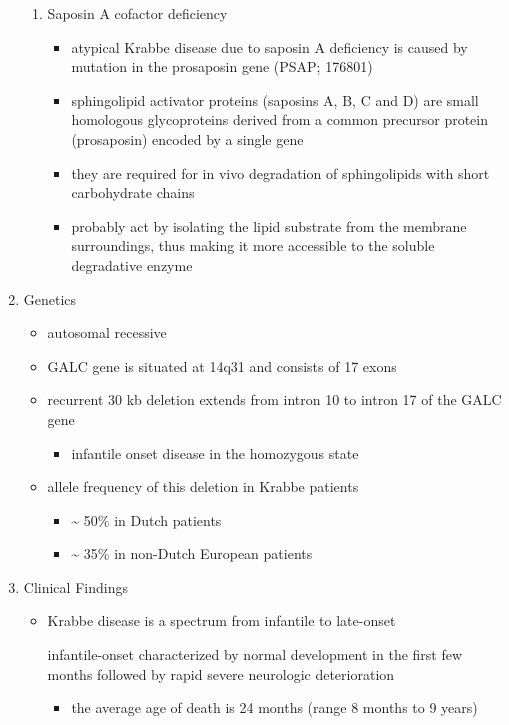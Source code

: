 \documentclass{scrartcl}
\begin{document}
\begin{enumerate}
\begin{enumerate}
\item Saposin A cofactor deficiency
\label{sec:orgf003849}

\begin{itemize}
\item atypical Krabbe disease due to saposin A deficiency is caused by mutation in the prosaposin gene (PSAP; 176801)
\item sphingolipid activator proteins (saposins A, B, C and D) are small
homologous glycoproteins derived from a common precursor protein
(prosaposin) encoded by a single gene
\item they are required for in vivo degradation of sphingolipids with short carbohydrate chains
\item probably act by isolating the lipid substrate from the membrane
surroundings, thus making it more accessible to the soluble
degradative enzyme
\end{itemize}
\end{enumerate}

\item Genetics
\label{sec:org3091962}
\begin{itemize}
\item autosomal recessive
\item GALC gene is situated at 14q31 and consists of 17 exons
\item recurrent 30 kb deletion extends from intron 10 to intron 17 of the GALC gene
\begin{itemize}
\item infantile onset disease in the homozygous state
\end{itemize}
\item allele frequency of this deletion in Krabbe patients
\begin{itemize}
\item \textasciitilde{} 50\% in Dutch patients
\item \textasciitilde{} 35\% in non-Dutch European patients
\end{itemize}
\end{itemize}

\item Clinical Findings
\label{sec:org1e8b5b5}
\begin{itemize}
\item Krabbe disease is a spectrum from infantile to late-onset

\item[{infantile-onset}] characterized by normal development in the first
few months followed by rapid severe neurologic deterioration
\begin{itemize}
\item the average age of death is 24 months (range 8 months to 9 years)
\end{itemize}


\end{itemize}
\end{enumerate}
\end{document}
